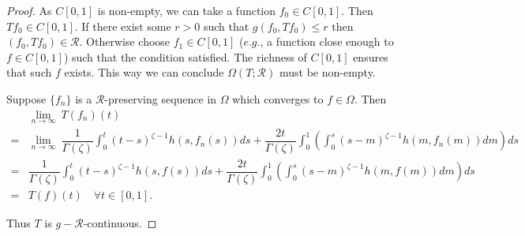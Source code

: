 \documentclass[10pt,a4paper]{amsart}
\begin{document}
\begin{proof}
As $ C [ 0, 1 ] $ is non-empty, we can take   a function $ f_0 \in C [ 0, 1 ] $. Then   $ T f _0 \in C [ 0, 1 ] $. If there exist some $ r > 0 $ such that $ g ( f_0, T f _0 ) \leq r $ then $ ( f_0, T f _0 ) \in \mathcal{R} $. Otherwise choose $ f_1 \in C [ 0, 1 ] $ ($e.g.$, a function close enough to $f \in  C [ 0, 1 ] $) such that the condition satisfied. The richness of $  C [ 0, 1 ] $ ensures that such $f$ exists.  This way we can conclude $ \Omega (T; \mathcal{R} ) $ must be non-empty.    

Suppose $ \{ f_n\} $ is a $ \mathcal{R} $-preserving sequence in $ \Omega$ which converges to $ f \in \Omega $. Then 
\begin{align*} 
	& \underset{ n \to \infty }{\lim} ~ T ( f_n ) ( t ) \\
    = & \underset{ n \to \infty }{\lim} ~ \dfrac{1}{\Gamma ( \zeta )} \int_{0}^{t} ( t- s)^{ \zeta - 1} h (s, f_n (s)) ds +   \dfrac{2 t }{\Gamma ( \zeta )} \int_{0}^{1}  \left( \int_{0}^{s} ( s - m)^{ \zeta - 1} h  ( m, f_n ( m ) ) dm    \right) ds \\
	 = & \dfrac{1}{\Gamma ( \zeta )} \int_{0}^{t} ( t- s)^{ \zeta - 1} h (s, f (s)) ds +   \dfrac{2 t }{\Gamma ( \zeta )} \int_{0}^{1}  \left( \int_{0}^{s} ( s - m)^{ \zeta - 1} h  ( m, f ( m ) ) dm    \right) ds \\
     = & T ( f ) ( t )  \quad \forall t \in [ 0, 1 ]. 
\end{align*} 

Thus $T$ is $g-\mathcal{R}$-continuous.


\end{proof}
\end{document}
